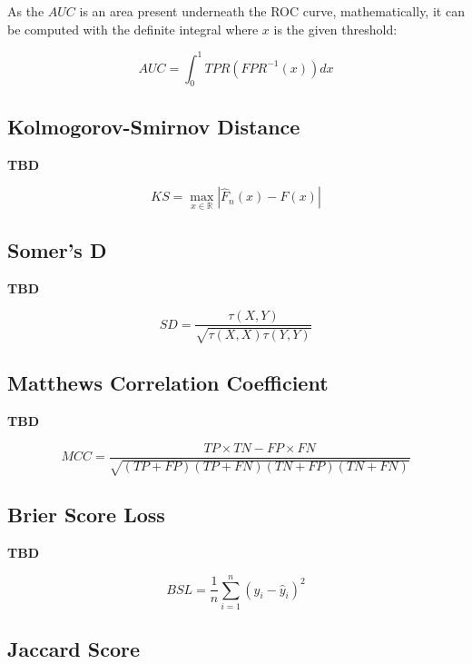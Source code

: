 As the $AUC$ is an area present underneath the ROC curve, mathematically, it can be computed with the definite integral where $x$ is the given threshold:

\begin{equation}\label{eq}
    AUC = \int_{0}^{1} TPR \left(FPR^{-1}\left(x \right)\right) dx
\end{equation}

\subsection{Kolmogorov-Smirnov Distance}

\textbf{TBD}

\begin{equation}\label{eq}
    KS = \max_{x \in \mathbb{R}} \left| \hat{F}_n \left(x \right) - F \left(x \right) \right|
\end{equation}


\subsection{Somer's D}

\textbf{TBD}

\begin{equation}\label{eq}
    SD = \frac{\tau \left(X, Y\right)}{\sqrt{\tau \left(X, X\right) \tau \left(Y, Y\right)}}
\end{equation}


\subsection{Matthews Correlation Coefficient}

\textbf{TBD}

\begin{equation}\label{eq}
    MCC = \frac{TP \times TN - FP \times FN}{\sqrt{(TP + FP) (TP + FN) (TN + FP) (TN + FN)}}
\end{equation}


\subsection{Brier Score Loss}

\textbf{TBD}

\begin{equation}\label{eq}
    BSL = \frac{1}{n} \sum_{i=1}^{n} (y_i - \hat{y}_i)^2
\end{equation}


\subsection{Jaccard Score}

